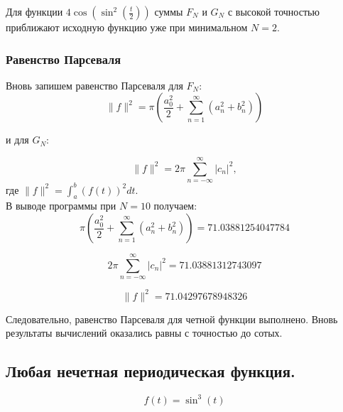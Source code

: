 \documentclass[a5paper, 10pt]{article}
\theoremstyle{definition}
\theoremstyle{plain}
\theoremstyle{remark}
\begin{document}
Для функции $4 \cos \left( \sin^2 \left( \frac{t}{2}\right) \right)$ суммы $F_N$ и $G_N$ с высокой точностью приближают исходную функцию уже при минимальном $N=2$. 
\newpage
\,
\newpage
\subsubsection{Равенство Парсеваля}

Вновь запишем равенство Парсеваля для $F_N$:
\begin{equation}
\| f \|^2 = \pi \left( \frac{a_0^2}{2} + \sum \limits_{n=1}^{\infty} \left( a_n^2 + b_n^2 \right) \right)
\end{equation}

и для $G_N$:

\begin{equation}
\| f \|^2 = 2 \pi \sum \limits_{n = -\infty}^{\infty} |c_n |^2,
\end{equation}
где $\| f \|^2 = \int_a^b (f(t))^2 dt $.
\\
 В выводе программы при $N=10$ получаем:
\begin{equation*}
 \pi \left( \frac{a_0^2}{2} + \sum \limits_{n=1}^{\infty} \left( a_n^2 + b_n^2 \right) \right) = 71.03881254047784
\end{equation*}

\begin{equation*}
2 \pi \sum \limits_{n = -\infty}^{\infty} |c_n |^2 = 71.03881312743097 
\end{equation*}

\begin{equation*}
\| f \|^2  = 71.04297678948326 
\end{equation*}

Следовательно, равенство Парсеваля для четной функции выполнено. Вновь результаты вычислений оказались равны с точностью до сотых.














\newpage
\subsection{Любая нечетная периодическая функция.}
\begin{equation}
f(t) = \sin^3(t)
\end{equation}
\end{document}
